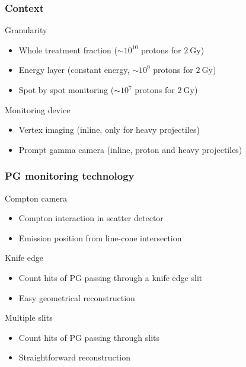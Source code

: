 \documentclass{beamer}
\begin{document}
\begin{frame}
\frametitle{Context}
\begin{block}{Granularity}
\begin{itemize}
\item Whole treatment fraction ($\sim10^{10}$ protons for $2~\mathrm{Gy}$)
\item Energy layer (constant energy, $\sim10^{9}$ protons for $2~\mathrm{Gy}$)
\item \alert<2->{Spot by spot monitoring} ($\sim10^7$ protons for $2~\mathrm{Gy}$)
\end{itemize}
\end{block}
\begin{block}{Monitoring device}
\begin{itemize}
\item Vertex imaging (inline, only for heavy projectiles)
\item \alert<3->{Prompt gamma camera} (inline, proton and heavy projectiles)
\end{itemize}
\end{block}
\end{frame}

\begin{frame}
\frametitle{PG monitoring technology}
\begin{block}{Compton camera}
\begin{itemize}
 \item Compton interaction in scatter detector
 \item Emission position from line-cone intersection
\end{itemize}
\end{block}
\begin{block}{Knife edge}
\begin{itemize}
 \item Count hits of PG passing through a knife edge slit
 \item Easy geometrical reconstruction
\end{itemize}
\end{block}
\begin{block}{\alert<2>{Multiple slits}}
\begin{itemize}
 \item Count hits of PG passing through slits
 \item Straightforward reconstruction
\end{itemize}
\end{block}
\end{frame}
\end{document}
